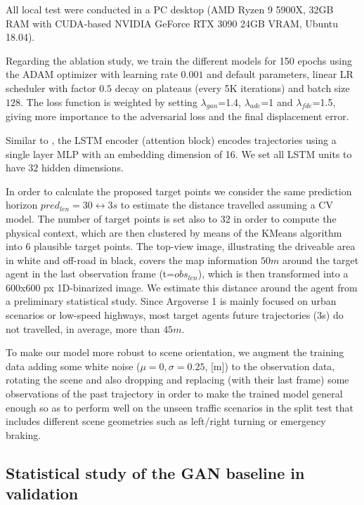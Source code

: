 All local test were conducted in a PC desktop (AMD Ryzen 9 5900X, 32GB RAM with \ac{CUDA}-based NVIDIA GeForce RTX 3090 24GB VRAM, Ubuntu 18.04).

Regarding the ablation study, we train the different models for 150 epochs using the \ac{ADAM} optimizer with learning rate $0.001$ and default parameters, linear \ac{LR} scheduler with factor $0.5$ decay on plateaus (every 5K iterations) and batch size $128$. The loss function is weighted by setting $\lambda_{gan}$=1.4, $\lambda_{ade}$=1 and $\lambda_{fde}$=1.5, giving more importance to the adversarial loss and the final displacement error. 

Similar to \cite{sadeghian2019sophie}, the \ac{LSTM} encoder (attention block) encodes trajectories using a single layer \ac{MLP} with an embedding dimension of 16. We set all \ac{LSTM} units to have $32$ hidden dimensions. 

In order to calculate the proposed target points we consider the same prediction horizon $pred_{len}=30 \longleftrightarrow 3s$ to estimate the distance travelled assuming a \ac{CV} model. The number of target points is set also to $32$ in order to compute the physical context, which are then clustered by means of the KMeans algorithm into $6$ plausible target points. The top-view image, illustrating the driveable area in white and off-road in black, covers the map information $50m$ around the target agent in the last observation frame (t=$obs_{len}$), which is then transformed into a 600x600 px 1D-binarized image. We estimate this distance around the agent from a preliminary statistical study. Since Argoverse 1 is mainly focused on urban scenarios or low-speed highways, most target agents future trajectories (3s) do not travelled, in average, more than $45m$.  

To make our model more robust to scene orientation, we augment the training data adding some white noise ($\mu=0, \sigma=0.25$, [m]) to the observation data, rotating the scene and also dropping and replacing (with their last frame) some observations of the past trajectory in order to make the trained model general enough so as to perform well on the unseen traffic scenarios in the split test that includes different scene geometries such as left/right turning or emergency braking.%

\subsection{Statistical study of the \ac{GAN} baseline in validation}
\label{subsec:5_target_agent_distribution}

